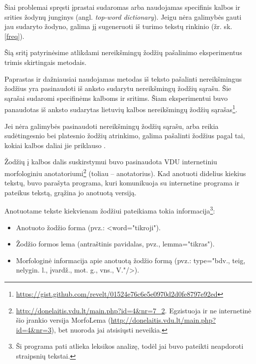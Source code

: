 \documentclass{VUMIFInfBakalaurinis}
\begin{document}
Šiai problemai spręsti įprastai sudaromas arba naudojamas specifinis
kalbos ir srities žodynų junginys (angl. \emph{top-word dictionary}).
Jeigu nėra galimybės gauti jau sudaryto žodyno, galima jį sugeneruoti iš
turimo tekstų rinkinio (žr. sk. \ref{freq}).

Šią sritį patyrinėsime atlikdami nereikšmingų žodžių pašalinimo
eksperimentus trimis skirtingais metodais.


Paprastas ir dažniausiai naudojamas metodas iš teksto pašalinti
nereikšmingus žodžius yra pasinaudoti iš anksto sudarytu nereikšmingų
žodžių sąrašu. Šie sąrašai sudaromi specifinėms kalboms ir sritims. Šiam
eksperimentui buvo panaudotas iš anksto sudarytas lietuvių kalbos
nereikšmingų žodžių sąrašas\footnote{\url{https://gist.github.com/revelt/01524e76c6e5e0970d2d0fe8797e92ed}}.

\label{parts}

Jei nėra galimybės pasinaudoti nereikšmingų žodžių sąrašu, arba reikia
sudėtingesnio bei platesnio žodžių atrinkimo, galima pašalinti žodžius
pagal tai, kokiai kalbos daliai jie priklauso \cite{gelavznikas2009elektroniniku}.

Žodžių į kalbos dalis suskirstymui buvo pasinaudota VDU internetiniu
morfologiniu anotatoriumi\footnote{\url{http://donelaitis.vdu.lt/main.php?id=4\&nr=7_2}.
  Egzistuoja ir ne internetinė šio įrankio versija MorfoLema
  (\url{http://donelaitis.vdu.lt/main.php?id=4\&nr=3}),
  bet nuoroda jai atsisiųsti neveikia.} (toliau -- anotatorius). Kad
anotuoti didelius kiekius tekstų, buvo parašyta programa, kuri komunikuoja su internetine programa ir pateikus tekstą,
grąžina jo anotuotą versiją.

Anotuotame tekste kiekvienam žodžiui pateikiama tokia
informacija\footnote{Ši programa pati atlieka leksikos analizę, todėl
  jai buvo pateikti neapdoroti straipsnių tekstai.}:

\begin{itemize}
\item
  Anotuoto žodžio forma (pvz.: \textless word="tikroji").
\item
  Žodžio formos lema (antraštinis pavidalas, pvz., lemma="tikras").
\item
  Morfologinė informacija apie anotuotą žodžio formą (pvz.: type="bdv.,
  teig, nelygin. l., įvardž., mot. g., vns., V."/\textgreater).
\end{itemize}
\end{document}
